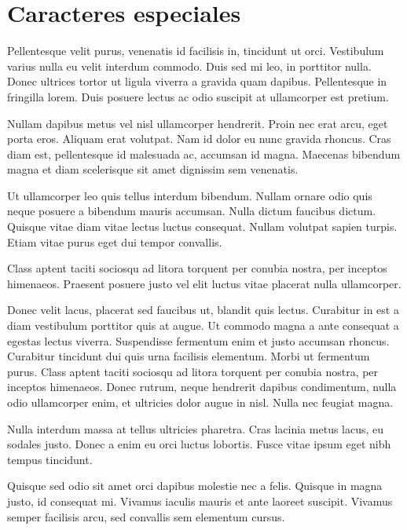 \documentclass[12pt,a4paper]{report}
\begin{document}
\section{Caracteres especiales}
\label{seccion.caracteres}





Pellentesque velit purus, venenatis id facilisis in, tincidunt ut orci. Vestibulum varius nulla eu velit interdum commodo. Duis sed mi leo, in porttitor nulla. Donec ultrices tortor ut ligula viverra a gravida quam dapibus. Pellentesque in fringilla lorem. Duis posuere lectus ac odio suscipit at ullamcorper est pretium.

Nullam dapibus metus vel nisl ullamcorper hendrerit. Proin nec erat arcu, eget porta eros. Aliquam erat volutpat. Nam id dolor eu nunc gravida rhoncus. Cras diam est, pellentesque id malesuada ac, accumsan id magna. Maecenas bibendum magna et diam scelerisque sit amet dignissim sem venenatis. 

Ut ullamcorper leo quis tellus interdum bibendum. Nullam ornare odio quis neque posuere a bibendum mauris accumsan. Nulla dictum faucibus dictum. Quisque vitae diam vitae lectus luctus consequat. Nullam volutpat sapien turpis. Etiam vitae purus eget dui tempor convallis. 

Class aptent taciti sociosqu ad litora torquent per conubia nostra, per inceptos himenaeos. Praesent posuere justo vel elit luctus vitae placerat nulla ullamcorper.

Donec velit lacus, placerat sed faucibus ut, blandit quis lectus. Curabitur in est a diam vestibulum porttitor quis at augue. Ut commodo magna a ante consequat a egestas lectus viverra. Suspendisse fermentum enim et justo accumsan rhoncus. Curabitur tincidunt dui quis urna facilisis elementum. Morbi ut fermentum purus. Class aptent taciti sociosqu ad litora torquent per conubia nostra, per inceptos himenaeos. Donec rutrum, neque hendrerit dapibus condimentum, nulla odio ullamcorper enim, et ultricies dolor augue in nisl. Nulla nec feugiat magna. 

Nulla interdum massa at tellus ultricies pharetra. Cras lacinia metus lacus, eu sodales justo. Donec a enim eu orci luctus lobortis. Fusce vitae ipsum eget nibh tempus tincidunt.

Quisque sed odio sit amet orci dapibus molestie nec a felis. Quisque in magna justo, id consequat mi. Vivamus iaculis mauris et ante laoreet suscipit. Vivamus semper facilisis arcu, sed convallis sem elementum cursus. 
\end{document}
